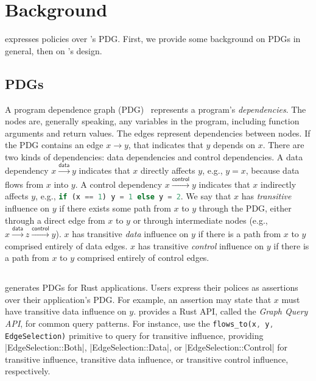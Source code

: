 \chapter{Background}

\syslang{} expresses policies over \sys{}'s PDG.
%
First, we provide some background on PDGs in general, then on \sys{}'s design.

\section{PDGs}
A program dependence graph (PDG)~\cite{ferranteProgramDependenceGraph1987} represents a program's \emph{dependencies}.
%
The nodes are, generally speaking, any variables in the program, including function arguments and return values.
%
The edges represent dependencies between nodes.
%
If the PDG contains an edge $x \xrightarrow{} y$, that indicates that $y$ depends on $x$.
%
There are two kinds of dependencies: data dependencies and control dependencies.
%
A data dependency $x \xrightarrow{\mathsf{data}} y$ indicates that $x$ directly affects $y$, e.g., $y = x$, 
because data flows from $x$ into $y$.
%
A control dependency $x \xrightarrow{\mathsf{control}} y$ indicates that $x$ indirectly affects $y$, 
e.g., \lstinline[language=Rust]|if (x == 1) y = 1 else y = 2|.
%
We say that $x$ has \emph{transitive} influence on $y$ if there exists some path from $x$ to $y$ through the PDG,
either through a direct edge from $x$ to $y$ or through intermediate nodes 
(e.g., $x \xrightarrow{\mathsf{data}} z \xrightarrow{\mathsf{control}} y$).
%
$x$ has transitive \emph{data} influence on $y$ if there is a path from $x$ to $y$ comprised entirely of data edges.
%
$x$ has transitive \emph{control} influence on $y$ if there is a path from $x$ to $y$ comprised entirely of control edges.

\section{\sys{}}

\sys{} generates PDGs for Rust applications.
%
Users express their polices as assertions over their application's PDG.
%
For example, an assertion may state that $x$ must have transitive data influence on $y$.
%
\sys{} provides a Rust API, called the \emph{Graph Query API}, for common query patterns.
%
For instance, \writers{} use the \lstinline[language=Rust]|flows_to(x, y,| \lstinline[language=Rust]|EdgeSelection)| primitive to query for transitive 
\break{} influence, providing |EdgeSelection::Both|, |EdgeSelection::Data|, 
\break{} or |EdgeSelection::Control| for transitive influence,
transitive data influence, or transitive control influence, respectively.

